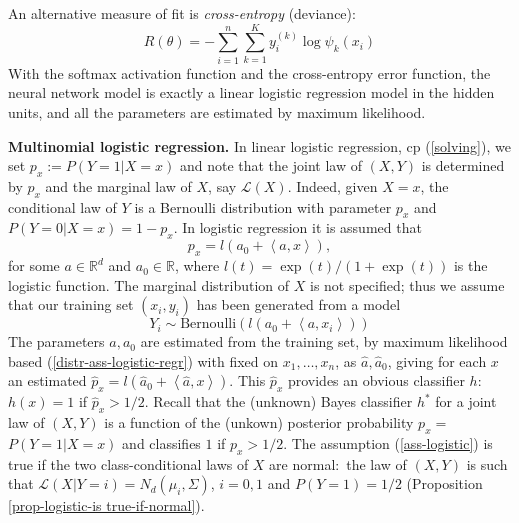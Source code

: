 \documentclass[11pt,twoside]{article}%
\theoremstyle{change}
\begin{document}
An alternative measure of fit is \textit{cross-entropy} (deviance):%
\begin{equation}
R(\theta)=-\sum_{i=1}^{n}\sum_{k=1}^{K}y_{i}^{(k)}\log\psi_{k}(x_{i}%
)\label{cross-entropy}%
\end{equation}
With the softmax activation function and the cross-entropy error function, the
neural network model is exactly a linear logistic regression model in the
hidden units, and all the parameters are estimated by maximum likelihood.

\bigskip

\textbf{Multinomial logistic regression. }In linear logistic regression, cp
(\ref{solving}), we set $p_{x}:=P\left(  Y=1|X=x\right)  $ and note that the
joint law of $\left(  X,Y\right)  $ is determined by $p_{x}$ and the marginal
law of $X$, say $\mathcal{L}(X)$. Indeed, given $X=x$, the conditional law of
$Y$ is a Bernoulli distribution with parameter $p_{x}$ and $P\left(
Y=0|X=x\right)  =1-p_{x}$. In logistic regression it is assumed that%
\begin{equation}
p_{x}=l(a_{0}+\left\langle a,x\right\rangle ),\label{ass-logistic}%
\end{equation}
for some $a\in\mathbb{R}^{d}$ and $a_{0}\in\mathbb{R}$, where $l(t)=\exp
(t)/\left(  1+\exp(t)\right)  $ is the logistic function. The marginal
distribution of $X$ is not specified; thus we assume that our training set
$(x_{i},y_{i})$ has been generated from a model%
\begin{equation}
Y_{i}\sim\mathrm{Bernoulli}\left(  l(a_{0}+\left\langle a,x_{i}\right\rangle
)\right) \label{distr-ass-logistic-regr}%
\end{equation}
The parameters $a,a_{0}$ are estimated from the training set, by maximum
likelihood based (\ref{distr-ass-logistic-regr}) with fixed on $x_{1}%
,\ldots,x_{n}$, as $\hat{a},\hat{a}_{0}$, giving for each $x$ an estimated
$\hat{p}_{x}=l(\hat{a}_{0}+\left\langle \hat{a},x\right\rangle )$. This
$\hat{p}_{x}$ provides an obvious classifier $h$: $h(x)=1$ if $\hat{p}%
_{x}>1/2$. Recall that the (unknown) Bayes classifier $h^{\ast}$ for a joint
law of $(X,Y)$ is a function of the (unkown) posterior probability $p_{x}=$
$P\left(  Y=1|X=x\right)  $ and classifies $1$ if $p_{x}>1/2$. The assumption
(\ref{ass-logistic}) is true if the two class-conditional laws of $X$ are
normal:\ the law of $(X,Y)$ is such that $\mathcal{L}(X|Y=i)=N_{d}(\mu
_{i},\Sigma)$, $i=0,1$ and $P(Y=1)=1/2$ (Proposition
\ref{prop-logistic-is true-if-normal}).
\end{document}
